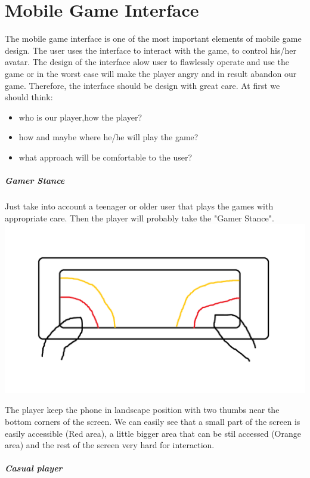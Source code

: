 \chapter{Mobile Game Interface}

The mobile game interface is one of the most important elements of mobile game design. The user uses the interface to interact with the game, to control his/her avatar. The design of the interface alow user to flawlessly operate and use the game or in the worst case will make the player angry and in result abandon our game. Therefore, the interface should be design with great care. At first we should think:
\begin{itemize}
\item who is our player,how the player?
\item how and maybe where he/he will play the game?
\item what approach will be comfortable to the user?
\end{itemize}

\paragraph*{Gamer Stance}
Just take into account a teenager or older user that plays the games with appropriate care. Then the player will probably take the "Gamer Stance".
\includegraphics[width=.8\textwidth]{chapters/img/gamerStance.png}

The player keep the phone in landscape position with two thumbs near the bottom corners of the screen. We can easily see that a small part of the screen is easily accessible (Red area), a little bigger area that can be stil accessed (Orange area) and the rest of the screen very hard for interaction.

\paragraph*{Casual player}

